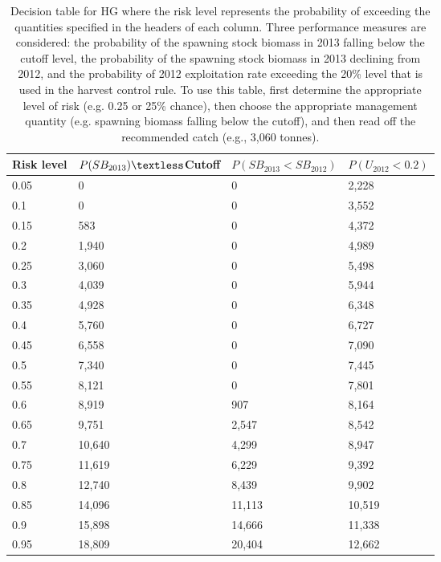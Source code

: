 %
\begin{table}[!tbp]
 \caption{Decision table for HG where the risk 
			level represents the probability of exceeding the quantities specified
			in the headers of each column.  Three performance measures are considered:
			the probability of the spawning stock biomass in 2013 falling below the cutoff
			level,  the probability of the spawning stock biomass in 2013 declining from 2012, 
			and the probability of 2012 exploitation rate exceeding the 20\% level that is
			used in the harvest control rule. To use this table, first determine the 
			appropriate level of risk (e.g. 0.25 or 25\% chance),  then choose the appropriate
			management quantity (e.g. spawning biomass falling below the cutoff), and then read
			off the recommended catch (e.g.,  3,060 tonnes).\label{Table:RiskHG}} 
 \begin{center}
 \begin{tabular}{llll}\hline\hline
\multicolumn{1}{c}{Risk level}&\multicolumn{1}{c}{$P(SB_{2013})\textless$Cutoff}&\multicolumn{1}{c}{$P(SB_{2013}<SB_{2012})$}&\multicolumn{1}{c}{$P(U_{2012}<0.2)$}\tabularnewline
\hline
0.05&     0&     0& 2,228\tabularnewline
0.1&     0&     0& 3,552\tabularnewline
0.15&   583&     0& 4,372\tabularnewline
0.2& 1,940&     0& 4,989\tabularnewline
0.25& 3,060&     0& 5,498\tabularnewline
0.3& 4,039&     0& 5,944\tabularnewline
0.35& 4,928&     0& 6,348\tabularnewline
0.4& 5,760&     0& 6,727\tabularnewline
0.45& 6,558&     0& 7,090\tabularnewline
0.5& 7,340&     0& 7,445\tabularnewline
0.55& 8,121&     0& 7,801\tabularnewline
0.6& 8,919&   907& 8,164\tabularnewline
0.65& 9,751& 2,547& 8,542\tabularnewline
0.7&10,640& 4,299& 8,947\tabularnewline
0.75&11,619& 6,229& 9,392\tabularnewline
0.8&12,740& 8,439& 9,902\tabularnewline
0.85&14,096&11,113&10,519\tabularnewline
0.9&15,898&14,666&11,338\tabularnewline
0.95&18,809&20,404&12,662\tabularnewline
\hline
\end{tabular}

\end{center}

\end{table}

